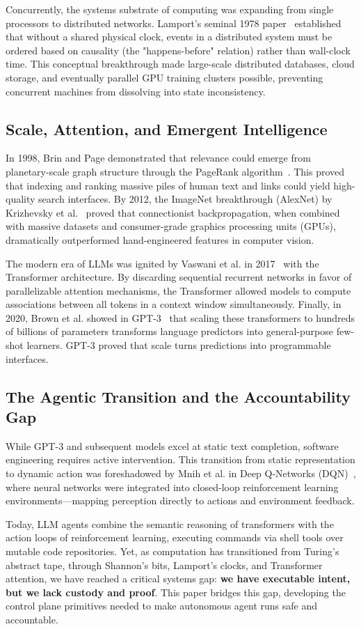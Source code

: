 Concurrently, the systems substrate of computing was expanding from single processors to distributed networks. Lamport's seminal 1978 paper~\cite{lamport1978time} established that without a shared physical clock, events in a distributed system must be ordered based on causality (the "happens-before" relation) rather than wall-clock time. This conceptual breakthrough made large-scale distributed databases, cloud storage, and eventually parallel GPU training clusters possible, preventing concurrent machines from dissolving into state inconsistency.

\subsection{Scale, Attention, and Emergent Intelligence}
In 1998, Brin and Page demonstrated that relevance could emerge from planetary-scale graph structure through the PageRank algorithm~\cite{brin1998anatomy}. This proved that indexing and ranking massive piles of human text and links could yield high-quality search interfaces. By 2012, the ImageNet breakthrough (AlexNet) by Krizhevsky et al.~\cite{krizhevsky2012imagenet} proved that connectionist backpropagation, when combined with massive datasets and consumer-grade graphics processing units (GPUs), dramatically outperformed hand-engineered features in computer vision.

The modern era of LLMs was ignited by Vaswani et al. in 2017~\cite{vaswani2017attention} with the Transformer architecture. By discarding sequential recurrent networks in favor of parallelizable attention mechanisms, the Transformer allowed models to compute associations between all tokens in a context window simultaneously. Finally, in 2020, Brown et al. showed in GPT-3~\cite{brown2020language} that scaling these transformers to hundreds of billions of parameters transforms language predictors into general-purpose few-shot learners. GPT-3 proved that scale turns predictions into programmable interfaces.

\subsection{The Agentic Transition and the Accountability Gap}
While GPT-3 and subsequent models excel at static text completion, software engineering requires active intervention. This transition from static representation to dynamic action was foreshadowed by Mnih et al. in Deep Q-Networks (DQN)~\cite{mnih2015human}, where neural networks were integrated into closed-loop reinforcement learning environments—mapping perception directly to actions and environment feedback.

Today, LLM agents combine the semantic reasoning of transformers with the action loops of reinforcement learning, executing commands via shell tools over mutable code repositories. Yet, as computation has transitioned from Turing's abstract tape, through Shannon's bits, Lamport's clocks, and Transformer attention, we have reached a critical systems gap: \textbf{we have executable intent, but we lack custody and proof}. This paper bridges this gap, developing the control plane primitives needed to make autonomous agent runs safe and accountable.
